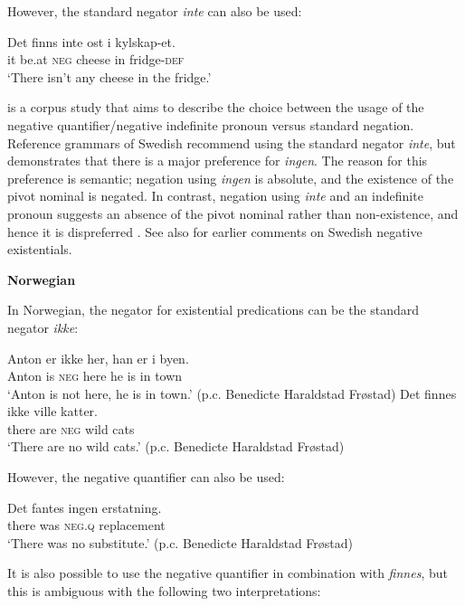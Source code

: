 ﻿\documentclass[output=paper]{langsci/langscibook}
\begin{document}
\begin{unindented}
However, the standard negator \textit{inte} can also be used:
%
\begin{exe}\ex \gll Det finns inte ost i  kylskap-et. \\
it be.at \textsc{neg} cheese in fridge-\textsc{def} \\
\glt `There isn't any cheese in the fridge.' \citep[115]{Veselinova2013}
    \end{exe}

\citet{Bordal2017} is a corpus study that aims to describe the choice
between the usage of the negative quantifier\slash negative indefinite
pronoun versus standard negation. Reference grammars of Swedish recommend
using the standard negator \textit{inte}, but \textcite[15ff]{Bordal2017} demonstrates that there is a major preference for \textit{ingen}. The reason for this preference is semantic; negation using \textit{ingen} is absolute, and the existence of the pivot nominal is negated. In contrast, negation using \textit{inte} and an indefinite pronoun suggests an absence of the pivot nominal rather than non-existence, and hence it is dispreferred \citep[21--22]{Bordal2017}. See also \citet[114--115]{Veselinova2013} for earlier comments on Swedish negative existentials.

\textbf{Norwegian}

In Norwegian, the negator for existential predications can be the standard negator \textit{ikke}:
%
\begin{exe}\ex \gll Anton er ikke her, han er i byen.  \\
Anton is \textsc{neg} here he is in town \\
    \glt `Anton is not here, he is in town.' (p.c. Benedicte Haraldstad Frøstad)
\ex \gll Det finnes ikke ville  katter. \\
there are \textsc{neg} wild cats \\
    \glt `There are no wild cats.' (p.c. Benedicte Haraldstad Frøstad)
    \end{exe}

However, the negative quantifier can also be used:
%
\begin{exe}\ex \gll Det fantes ingen   erstatning. \\
there was    \textsc{neg.q}  replacement \\
    \glt `There was no substitute.' (p.c. Benedicte Haraldstad Frøstad)
    \end{exe}

It is also possible to use the negative quantifier in combination with \textit{finnes}, but this is ambiguous with the following two interpretations:


\end{unindented}
\end{document}
